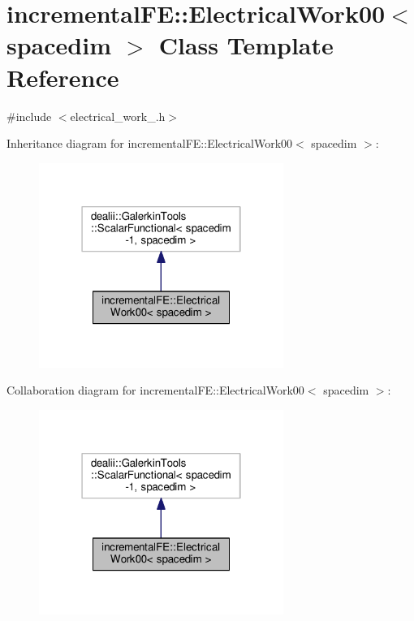 \hypertarget{classincremental_f_e_1_1_electrical_work00}{}\section{incremental\+FE\+:\+:Electrical\+Work00$<$ spacedim $>$ Class Template Reference}
\label{classincremental_f_e_1_1_electrical_work00}


{\ttfamily \#include $<$electrical\+\_\+work\+\_.\+h$>$}



Inheritance diagram for incremental\+FE\+:\+:Electrical\+Work00$<$ spacedim $>$\+:\nopagebreak
\begin{figure}[H]
\begin{center}
\leavevmode
\includegraphics[width=226pt]{classincremental_f_e_1_1_electrical_work00__inherit__graph}
\end{center}
\end{figure}


Collaboration diagram for incremental\+FE\+:\+:Electrical\+Work00$<$ spacedim $>$\+:\nopagebreak
\begin{figure}[H]
\begin{center}
\leavevmode
\includegraphics[width=226pt]{classincremental_f_e_1_1_electrical_work00__coll__graph}
\end{center}
\end{figure}
